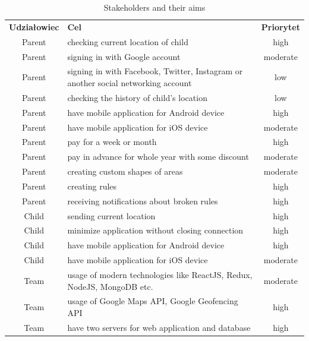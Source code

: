 \documentclass{sprawozdanie-agh}
\begin{document}
			\begin{table}[h]
				\begin{center}
					\begin{tabular}{|c|p{7cm}|c|}
						\cline{1-3}
						\textbf{Udziałowiec} & \textbf{Cel} & \textbf{Priorytet} \\
						\cline{1-3}
						Parent & checking current location of child & high \\
						\cline{1-3}
						Parent & signing in with Google account & moderate \\
						\cline{1-3}
						Parent & signing in with Facebook, Twitter, Instagram or another social networking account & low \\
						\cline{1-3}
						Parent & checking the history of child's location & low \\
						\cline{1-3}
						Parent & have mobile application for Android device & high \\
						\cline{1-3}
						Parent & have mobile application for iOS device & moderate \\
						\cline{1-3}
						Parent & pay for a week or month & high \\
						\cline{1-3}
						Parent & pay in advance for whole year with some discount & moderate \\
						\cline{1-3}
						Parent & creating custom shapes of areas & moderate \\
						\cline{1-3}
						Parent & creating rules & high \\
						\cline{1-3}
						Parent & receiving notifications about broken rules & high \\
						\cline{1-3}
						Child & sending current location & high \\
						\cline{1-3}
						Child & minimize application without closing connection & high \\
						\cline{1-3}
						Child & have mobile application for Android device & high \\
						\cline{1-3}
						Child & have mobile application for iOS device & moderate \\
						\cline{1-3}
						Team & usage of modern technologies like ReactJS, Redux, NodeJS, MongoDB etc. & moderate \\
						\cline{1-3}
						Team & usage of Google Maps API, Google Geofencing API & high \\
						\cline{1-3}
						Team & have two servers for web application and database & high \\
						\cline{1-3}
					\end{tabular}
				\end{center}
				\caption{Stakeholders and their aims}
			\end{table}
\end{document}
